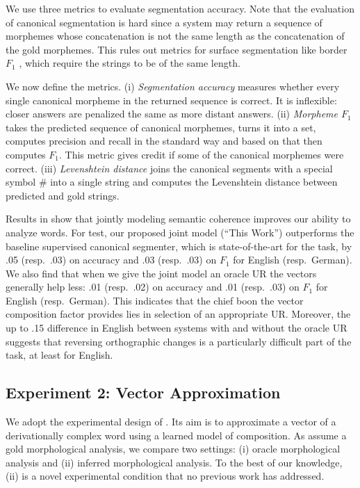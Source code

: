 \documentclass[11pt,letterpaper]{article}
\begin{document}
We use three metrics to evaluate  segmentation accuracy. Note that
the evaluation of canonical segmentation is  hard since a system may return a
sequence of morphemes whose concatenation is not the same length as
the concatenation of the gold morphemes. This rules out
metrics for surface segmentation like border $F_1$ \cite{kurimo2010morpho},
which require the strings to be of the same length.

We now define the metrics. (i) \emph{Segmentation
  accuracy} measures whether every
single canonical morpheme in the returned sequence is correct. It
is  inflexible: closer answers are penalized the same as
more distant answers. 
 (ii)
\emph{Morpheme $F_1$} \cite{van1999memory} takes the predicted sequence of canonical
morphemes, turns it into a set,  computes precision and
recall in the standard way and based on that then computes $F_1$. This metric gives credit
if some of the canonical morphemes were correct. 
 (iii) \emph{Levenshtein distance}
 joins the canonical segments with a
special symbol \# into a single string and  computes
the Levenshtein distance between predicted and gold strings. 

Results 
in 
show  that jointly modeling semantic coherence
improves our ability to analyze words. For test,
our proposed joint model (``This Work'')
outperforms the baseline supervised canonical segmenter, which is
state-of-the-art for the task, by
.05 (resp.\ .03) on accuracy and .03 (resp.\ .03) on $F_1$
for English (resp.\ German).
We also find that when we give the
joint model an oracle UR the vectors generally help
less:
.01 (resp.\ .02) on accuracy and .01 (resp.\ .03) on $F_1$ for
English (resp.\ German).
 This indicates that the chief boon the vector composition
factor provides lies in selection of an appropriate UR. Moreover, the
up to .15  difference in English between systems with and without the oracle UR
suggests that reversing  orthographic changes is a
particularly difficult part of the task, at least for English.

\subsection{Experiment 2: Vector Approximation}
We adopt the experimental design of
. Its aim
is to approximate a vector of a derivationally complex word using
a learned model of composition. As  assume
a gold morphological analysis, we compare two settings: (i) oracle morphological analysis
and (ii) inferred morphological analysis. To the best of our knowledge,
(ii) is a novel experimental condition that no previous work
has 
 addressed.
\end{document}
